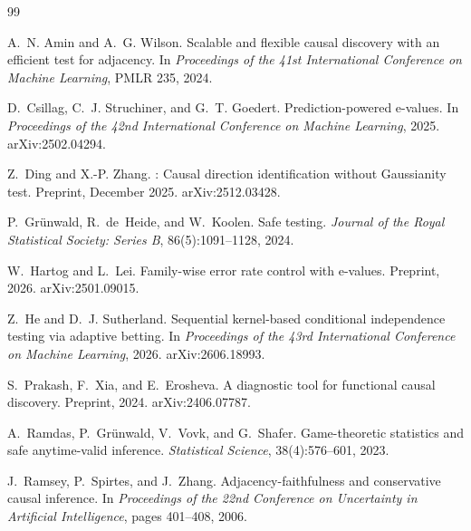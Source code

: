 \documentclass[11pt,a4paper]{article}
\theoremstyle{definition}
\theoremstyle{remark}
\begin{document}

\begin{thebibliography}{99}

A.~N. Amin and A.~G. Wilson.
\newblock Scalable and flexible causal discovery with an efficient test for adjacency.
\newblock In \emph{Proceedings of the 41st International Conference on Machine
  Learning}, PMLR 235, 2024.

D.~Csillag, C.~J. Struchiner, and G.~T. Goedert.
\newblock Prediction-powered e-values.
\newblock In \emph{Proceedings of the 42nd International Conference on Machine
  Learning}, 2025. arXiv:2502.04294.

Z.~Ding and X.-P. Zhang.
: Causal direction identification without
  {G}aussianity test.
\newblock Preprint, December 2025. arXiv:2512.03428.

P.~Gr\"unwald, R.~de~Heide, and W.~Koolen.
\newblock Safe testing.
\newblock \emph{Journal of the Royal Statistical Society: Series B}, 86(5):1091--1128, 2024.

W.~Hartog and L.~Lei.
\newblock Family-wise error rate control with e-values.
\newblock Preprint, 2026. arXiv:2501.09015.

Z.~He and D.~J. Sutherland.
\newblock Sequential kernel-based conditional independence testing via adaptive betting.
\newblock In \emph{Proceedings of the 43rd International Conference on Machine
  Learning}, 2026. arXiv:2606.18993.

S.~Prakash, F.~Xia, and E.~Erosheva.
\newblock A diagnostic tool for functional causal discovery.
\newblock Preprint, 2024. arXiv:2406.07787.

A.~Ramdas, P.~Gr\"unwald, V.~Vovk, and G.~Shafer.
\newblock Game-theoretic statistics and safe anytime-valid inference.
\newblock \emph{Statistical Science}, 38(4):576--601, 2023.

J.~Ramsey, P.~Spirtes, and J.~Zhang.
\newblock Adjacency-faithfulness and conservative causal inference.
\newblock In \emph{Proceedings of the 22nd Conference on Uncertainty in
  Artificial Intelligence}, pages 401--408, 2006.


\end{thebibliography}
\end{document}
